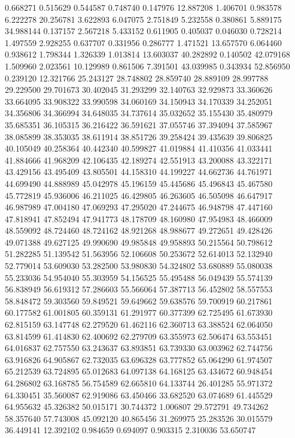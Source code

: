 0.668271
0.515629
0.544587
0.748740
0.147976
12.887208
1.406701
0.983578
6.222278
20.256781
3.622893
6.047075
2.751849
5.232558
0.380861
5.889175
34.988144
0.137157
2.567218
5.433152
0.611905
0.405037
0.046030
0.728214
1.497559
2.928255
0.637707
0.331956
0.286777
1.471521
13.657570
6.064460
0.938612
1.798344
1.326339
1.013814
13.603037
40.282892
0.140502
42.079168
1.509960
2.023561
10.129989
0.861506
7.391501
43.039985
0.343934
52.856950
0.239120
12.321766
25.243127
28.748802
28.859740
28.889109
28.997788
29.229500
29.701673
30.402045
31.293299
32.140763
32.929873
33.360626
33.664095
33.908322
33.990598
34.060169
34.150943
34.170339
34.252051
34.356806
34.366994
34.648035
34.737614
35.032652
35.155430
35.480979
35.685351
36.105315
36.216422
36.591621
37.055746
37.394094
37.585967
38.085899
38.353035
38.611914
38.851726
39.258424
39.435639
39.806825
40.105049
40.258364
40.442340
40.599827
41.019884
41.410356
41.033441
41.884666
41.968209
42.106435
42.189274
42.551913
43.200088
43.322171
43.429156
43.495409
43.805501
44.158310
44.199227
44.662736
44.761971
44.699490
44.888989
45.042978
45.196159
45.445686
45.496843
45.467580
45.772819
45.936006
46.211025
46.429805
46.263605
46.505098
46.647917
46.987989
47.004180
47.069293
47.295020
47.244675
46.948798
47.447160
47.818941
47.852494
47.941773
48.178709
48.160980
47.954983
48.466009
48.559092
48.724460
48.724162
48.921268
48.988677
49.272651
49.428426
49.071388
49.627125
49.990690
49.985848
49.958893
50.215564
50.798612
51.282285
51.139542
51.563956
52.106608
50.253672
52.614013
52.132940
52.779014
53.609030
53.282500
53.980830
54.324802
53.680889
55.080038
55.233036
54.954040
55.303959
54.156525
55.495488
56.049439
55.574139
56.838949
56.619312
57.286603
55.566064
57.387713
56.452802
58.557553
58.848472
59.303560
59.849521
59.649662
59.638576
59.700919
60.217861
60.177582
61.001805
60.359131
61.291977
60.377399
62.725495
61.673930
62.815159
63.147748
62.279520
61.462116
62.360713
63.388524
62.064050
63.814599
61.414830
62.400692
62.279709
63.355973
62.506474
63.553451
64.016837
62.757550
63.243637
63.893851
63.739330
63.003962
62.744756
63.916826
64.905867
62.732035
63.696328
63.777852
65.064290
61.974507
65.212539
63.724895
65.012683
64.097138
64.168125
63.434672
60.948454
64.286802
63.168785
56.754589
62.665810
64.133744
26.401285
55.971372
64.330451
35.560087
62.919086
63.450466
33.682520
63.074689
61.445529
64.955632
45.326382
50.015171
30.744372
1.006807
29.572791
49.734262
58.357640
57.743008
45.092120
40.865456
31.269975
25.283526
30.015579
36.449141
12.392102
0.984659
0.694097
0.903315
2.310036
53.650747
